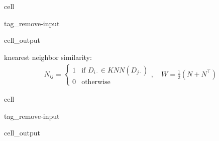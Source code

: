 \documentclass[letterpaper,10pt,english]{jupyterBook}
\begin{document}
\begin{sphinxuseclass}{cell}
\begin{sphinxuseclass}{tag_remove-input}\begin{sphinxVerbatimOutput}

\begin{sphinxuseclass}{cell_output}
\noindent{}

\end{sphinxuseclass}\end{sphinxVerbatimOutput}

\end{sphinxuseclass}
\end{sphinxuseclass}
\sphinxAtStartPar
k\sphinxhyphen{}nearest neighbor similarity:
\begin{equation*}
\begin{split}N_{ij}= \begin{cases}1& \text{if } D_{i\cdot} \in KNN(D_{j\cdot})\\
0& \text{otherwise}\end{cases},\quad W=\frac12(N+N^\top)\end{split}
\end{equation*}

\begin{sphinxuseclass}{cell}
\begin{sphinxuseclass}{tag_remove-input}\begin{sphinxVerbatimOutput}

\begin{sphinxuseclass}{cell_output}
\noindent{}

\end{sphinxuseclass}\end{sphinxVerbatimOutput}

\end{sphinxuseclass}
\end{sphinxuseclass}
\end{document}
